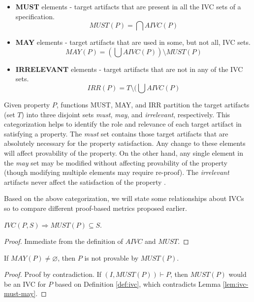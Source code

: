 \begin{itemize}
  \item \textbf{MUST} elements - target artifacts that are present in all the IVC sets of a specification.
      \[
      MUST (P) = \bigcap AIVC(P)
      \]

  \item \textbf{MAY} elements - target artifacts that are used in some, but not all, IVC sets.
      \[
      MAY(P) = (\bigcup AIVC (P)) \setminus MUST (P)
      \]

  \item \textbf{IRRELEVANT} elements - target artifacts that are not in any of the IVC sets.
  $$IRR(P) = T \setminus (\bigcup AIVC (P)$$
\end{itemize}

Given property $P$, functions MUST, MAY, and IRR partition the target artifacts (set $T$) into three disjoint sets \emph{must}, \emph{may}, and \emph{irrelevant}, respectively. This categorization helps to identify the role and relevance of each target artifact in satisfying a property. The \emph{must} set contains those target artifacts that are absolutely necessary for the property satisfaction.  Any change to these elements will affect provability of the property. On the other hand, any single element in the \emph{may} set may be modified without affecting provability of the property (though modifying multiple elements may require re-proof).   The \emph{irrelevant} artifacts never affect the satisfaction of the property \cite{Murugesan16:renext}.

Based on the above categorization, we will state some relationships about IVCs so to compare different proof-based metrics proposed earlier.

\begin{lemma}
  \label{lem:ivc-must-may}
 $IVC(P, S) \Rightarrow  MUST(P) \subseteq S$.
\end{lemma}
\begin{proof}
 Immediate from the definition of $AIVC$ and $MUST$.
\end{proof}
\vspace{2mm}

\begin{lemma}
  \label{lem:must-not-enough}
  If $MAY(P) \neq \varnothing$, then $P$ is not provable by $MUST(P)$.
\end{lemma}
\begin{proof}
  Proof by contradiction. If $(I, MUST(P)) \vdash P$, then $MUST(P)$
  would be an IVC for $P$ based on Definition \ref{def:ivc},
  which contradicts Lemma \ref{lem:ivc-must-may}.
\end{proof}
\vspace{2mm}

